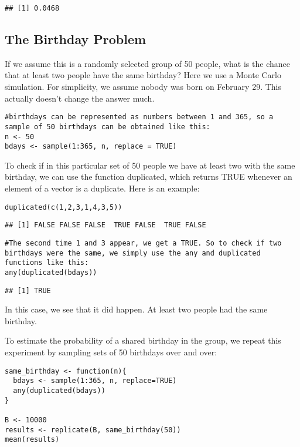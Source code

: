 \documentclass[
]{article}
\begin{document}
\begin{verbatim}
## [1] 0.0468
\end{verbatim}

\hypertarget{the-birthday-problem}{%
\subsection{The Birthday Problem}\label{the-birthday-problem}}

If we assume this is a randomly selected group of 50 people, what is the
chance that at least two people have the same birthday? Here we use a
Monte Carlo simulation. For simplicity, we assume nobody was born on
February 29. This actually doesn't change the answer much.

\begin{verbatim}
#birthdays can be represented as numbers between 1 and 365, so a sample of 50 birthdays can be obtained like this:
n <- 50
bdays <- sample(1:365, n, replace = TRUE)
\end{verbatim}

To check if in this particular set of 50 people we have at least two
with the same birthday, we can use the function duplicated, which
returns TRUE whenever an element of a vector is a duplicate. Here is an
example:

\begin{verbatim}
duplicated(c(1,2,3,1,4,3,5))
\end{verbatim}

\begin{verbatim}
## [1] FALSE FALSE FALSE  TRUE FALSE  TRUE FALSE
\end{verbatim}

\begin{verbatim}
#The second time 1 and 3 appear, we get a TRUE. So to check if two birthdays were the same, we simply use the any and duplicated functions like this:
any(duplicated(bdays))
\end{verbatim}

\begin{verbatim}
## [1] TRUE
\end{verbatim}

In this case, we see that it did happen. At least two people had the
same birthday.

To estimate the probability of a shared birthday in the group, we repeat
this experiment by sampling sets of 50 birthdays over and over:

\begin{verbatim}
same_birthday <- function(n){
  bdays <- sample(1:365, n, replace=TRUE)
  any(duplicated(bdays))
}

B <- 10000
results <- replicate(B, same_birthday(50))
mean(results)
\end{verbatim}
\end{document}
